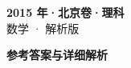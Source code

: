 \documentclass[zihao=-4, a4paper]{ctexart}
\begin{document}
\begin{center}
  {\Large\bfseries 2015 年·北京卷·理科}\\[4pt]
  {\large 数学 · 解析版}
\end{center}
\medskip
{}

\clearpage
{}
\begin{center}{\Large\bfseries 参考答案与详细解析}\end{center}
\medskip

\end{document}
